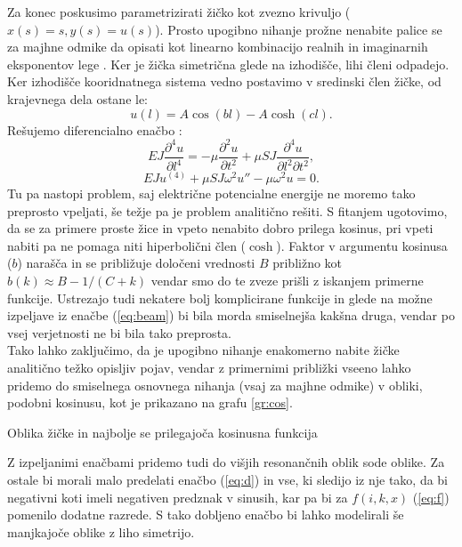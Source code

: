 \documentclass{article}
\begin{document}
\vspace{1ex}
\noindent Za konec poskusimo parametrizirati žičko kot zvezno krivuljo ($x(s)=s, y(s)=u(s)$). Prosto upogibno nihanje prožne nenabite palice se za majhne odmike da opisati kot linearno kombinacijo realnih in imaginarnih eksponentov lege \cite{Kuščer_Kodre_Neunzert_Razpet_2016}. Ker je žička simetrična glede na izhodišče, lihi členi odpadejo. Ker izhodišče kooridnatnega sistema vedno postavimo v sredinski člen žičke, od krajevnega dela ostane le:
\begin{equation}
    u(l)=A\cos(bl)-A\cosh(cl).
\end{equation}
Rešujemo diferencialno enačbo \cite{Kuščer_Kodre_Neunzert_Razpet_2016}:
\begin{equation}
    EJ\frac{\partial^4u}{\partial l^4}=-\mu\frac{\partial^2u}{\partial t^2}+\mu SJ\frac{\partial^4u}{\partial l^2\partial t^2},
\end{equation}
\begin{equation}
    EJu^{(4)}+\mu SJ\omega^2u''-\mu\omega^2u=0.
    \label{eq:beam}
\end{equation}
Tu pa nastopi problem, saj električne potencialne energije ne moremo tako preprosto vpeljati, še težje pa je problem analitično rešiti. S fitanjem ugotovimo, da se za primere proste žice in vpeto nenabito dobro prilega kosinus, pri vpeti nabiti pa ne pomaga niti hiperbolični člen ($\cosh$). Faktor v argumentu kosinusa ($b$) narašča in se približuje določeni vrednosti $B$ približno kot $b(k)\approx B-1/(C+k)$ vendar smo do te zveze prišli z iskanjem primerne funkcije. Ustrezajo tudi nekatere bolj komplicirane funkcije in glede na možne izpeljave iz enačbe (\ref{eq:beam}) bi bila morda smiselnejša kakšna druga, vendar po vsej verjetnosti ne bi bila tako preprosta.\\

Tako lahko zaključimo, da je upogibno nihanje enakomerno nabite žičke analitično težko opisljiv pojav, vendar z primernimi približki vseeno lahko pridemo do smiselnega osnovnega nihanja (vsaj za majhne odmike) v obliki, podobni kosinusu, kot je prikazano na grafu \ref{gr:cos}.
\begin{graph}[H]
    \centering
    
    \caption{Oblika žičke in najbolje se prilegajoča kosinusna funkcija}
    \label{gr:cos}
\end{graph}
\noindent Z izpeljanimi enačbami pridemo tudi do višjih resonančnih oblik sode oblike. Za ostale bi morali malo predelati enačbo (\ref{eq:d}) in vse, ki sledijo iz nje tako, da bi negativni koti imeli negativen predznak v sinusih, kar pa bi za $f(i,k,x)$ (\ref{eq:f}) pomenilo dodatne razrede. S tako dobljeno enačbo bi lahko modelirali še manjkajoče oblike z liho simetrijo.


\printbibliography
\end{document}

